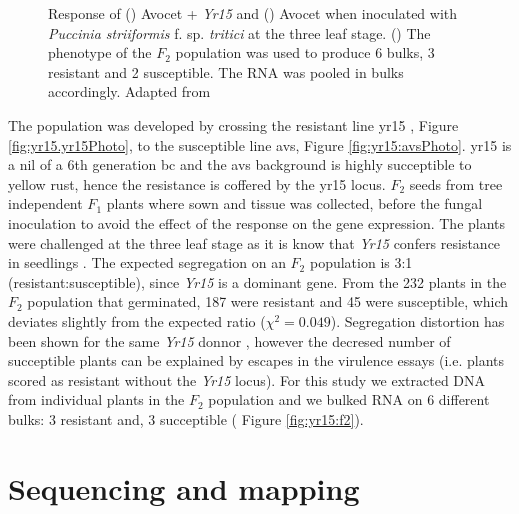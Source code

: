 \begin{figure}
    \caption{Response of () Avocet + \textit{Yr15} and () Avocet when inoculated with \textit{Puccinia striiformis} f. sp.  \textit{tritici} at the three leaf stage. () The phenotype of the $F_{2}$ population was used to produce 6 bulks, 3 resistant and 2 susceptible. The RNA was pooled in bulks accordingly. Adapted from \citep{Ramirez-Gonzalez2015b}}

\end{figure}

The population was developed by crossing the resistant line \gls{yr15} \citep{Wellings1998}, Figure \ref{fig:yr15.yr15Photo}, to the susceptible line \gls{avs}, Figure \ref{fig:yr15:avsPhoto}. 
\acrshort{yr15} is a \gls{nil} of a 6th generation \gls{bc} and the \acrshort{avs} background is highly succeptible to yellow rust, hence the resistance is coffered by the \acrshort{yr15} locus. 
$F_{2}$ seeds from tree independent $F_{1}$ plants where sown and tissue was collected, before the fungal inoculation to avoid the effect of the response on the gene expression.  
The plants were challenged at the three leaf stage as it is know that \textit{Yr15} confers resistance in seedlings \citep{Gerechter-Amitai1989}.
The expected segregation on an $F_{2}$ population is 3:1 (resistant:susceptible), since \textit{Yr15} is a dominant gene.
From the 232 plants in the $F_{2}$ population that germinated, 187 were resistant and 45 were susceptible, which deviates slightly from the expected ratio ($\chi^{2}=0.049$).
Segregation distortion has been shown for the same \textit{Yr15} donnor \citep{Randhawa2009}, however the decresed number of succeptible plants can be explained by escapes in the virulence essays (i.e. plants scored as resistant without the \textit{Yr15} locus).   For this study we extracted DNA from individual plants in the $F_{2}$ population and we bulked RNA on 6 different bulks: 3 resistant and, 3 succeptible ( Figure \ref{fig:yr15:f2}). 

\section{Sequencing and mapping} 

